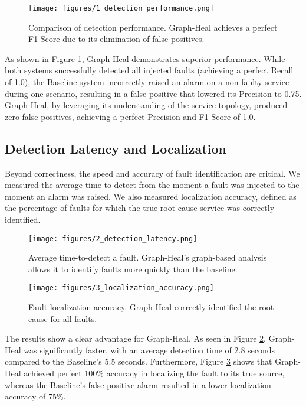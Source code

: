 \documentclass[11pt,conference]{IEEEtran}
\begin{document}
\begin{figure}[ht]
  \centering
  \texttt{[image: figures/1\_detection\_performance.png]}
  \caption{Comparison of detection performance. Graph-Heal achieves a perfect F1-Score due to its elimination of false positives.}
  \label{fig:detection-performance}
\end{figure}

As shown in Figure \ref{fig:detection-performance}, Graph-Heal demonstrates superior performance. While both systems successfully detected all injected faults (achieving a perfect Recall of 1.0), the Baseline system incorrectly raised an alarm on a non-faulty service during one scenario, resulting in a false positive that lowered its Precision to 0.75. Graph-Heal, by leveraging its understanding of the service topology, produced zero false positives, achieving a perfect Precision and F1-Score of 1.0.

\subsection{Detection Latency and Localization}
Beyond correctness, the speed and accuracy of fault identification are critical. We measured the average time-to-detect from the moment a fault was injected to the moment an alarm was raised. We also measured localization accuracy, defined as the percentage of faults for which the true root-cause service was correctly identified.

\begin{figure}[ht]
  \centering
  \texttt{[image: figures/2\_detection\_latency.png]}
  \caption{Average time-to-detect a fault. Graph-Heal's graph-based analysis allows it to identify faults more quickly than the baseline.}
  \label{fig:detection-latency}
\end{figure}

\begin{figure}[ht]
  \centering
  \texttt{[image: figures/3\_localization\_accuracy.png]}
  \caption{Fault localization accuracy. Graph-Heal correctly identified the root cause for all faults.}
  \label{fig:localization-accuracy}
\end{figure}

The results show a clear advantage for Graph-Heal. As seen in Figure \ref{fig:detection-latency}, Graph-Heal was significantly faster, with an average detection time of 2.8 seconds compared to the Baseline's 5.5 seconds. Furthermore, Figure \ref{fig:localization-accuracy} shows that Graph-Heal achieved perfect 100\% accuracy in localizing the fault to its true source, whereas the Baseline's false positive alarm resulted in a lower localization accuracy of 75\%.
\end{document}
